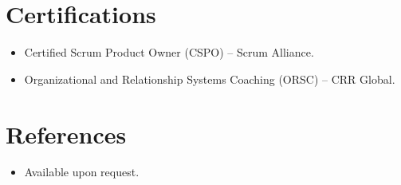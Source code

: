 \documentclass[11pt,a4paper,sans]{moderncv}
\begin{document}

\section{Certifications}
\vspace{1pt}
\begin{itemize}
\item Certified Scrum Product Owner (CSPO) -- Scrum Alliance.
\item Organizational and Relationship Systems Coaching (ORSC) -- CRR Global.
\end{itemize}


\section{References}
\vspace{1pt}
\begin{itemize}
\item{Available upon request.}
\end{itemize}
\end{document}
